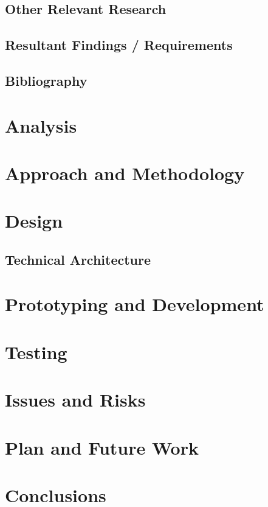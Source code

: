 \documentclass[a4paper, 12pt]{article}
\begin{document}
\subsection{Other Relevant Research}

\subsection{Resultant Findings / Requirements}
\subsection{Bibliography}
\section{Analysis}
\section{Approach and Methodology}
\section{Design}
\subsection{Technical Architecture}
\section{Prototyping and Development}
\section{Testing}
\section{Issues and Risks}
\section{Plan and Future Work}
\section{Conclusions}
\end{document}
